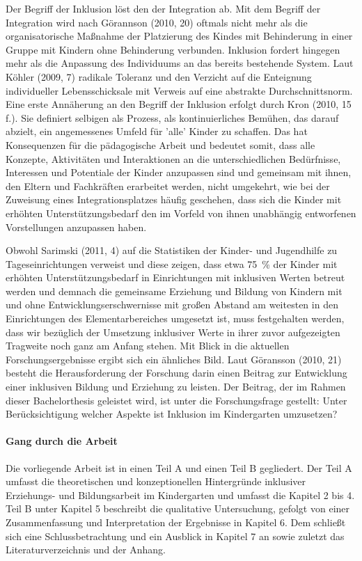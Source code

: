 Der Begriff der Inklusion löst den der Integration ab. Mit dem Begriff der Integration wird nach Görannson (2010, 20) oftmals nicht mehr als die organisatorische Maßnahme der Platzierung des Kindes mit Behinderung in einer Gruppe mit Kindern ohne Behinderung verbunden. Inklusion fordert hingegen mehr als die Anpassung des Individuums an das bereits bestehende System. Laut Köhler (2009, 7) radikale Toleranz und den Verzicht auf die Enteignung individueller Lebensschicksale mit Verweis auf eine abstrakte Durchschnittsnorm. Eine erste Annäherung an den Begriff der Inklusion erfolgt durch Kron (2010, 15 f.). Sie definiert selbigen als Prozess, als kontinuierliches Bemühen, das darauf abzielt, ein angemessenes Umfeld für ’alle’ Kinder zu schaffen. Das hat Konsequenzen für die pädagogische Arbeit und bedeutet somit, dass alle Konzepte, Aktivitäten und Interaktionen an die unterschiedlichen Bedürfnisse, Interessen und Potentiale der Kinder anzupassen sind und gemeinsam mit ihnen, den Eltern und Fachkräften erarbeitet werden, nicht umgekehrt, wie bei der Zuweisung eines Integrationsplatzes häufig geschehen, dass sich die Kinder mit erhöhten Unterstützungsbedarf den im Vorfeld von ihnen unabhängig entworfenen Vorstellungen anzupassen haben.  

Obwohl Sarimski (2011, 4) auf die Statistiken der Kinder- und Jugendhilfe zu Tageseinrichtungen verweist und diese zeigen, dass etwa 75~\% der Kinder mit erhöhten Unterstützungsbedarf in Einrichtungen mit inklusiven Werten betreut werden und demnach die gemeinsame Erziehung und Bildung von Kindern mit und ohne Entwicklungserschwernisse mit großen Abstand am weitesten in den Einrichtungen des Elementarbereiches umgesetzt ist, muss festgehalten werden, dass wir bezüglich der Umsetzung inklusiver Werte in ihrer zuvor aufgezeigten Tragweite noch ganz am Anfang stehen. Mit Blick in die aktuellen Forschungsergebnisse ergibt sich ein ähnliches Bild. Laut Göransson (2010, 21) besteht die Herausforderung der Forschung darin einen Beitrag zur Entwicklung einer inklusiven Bildung und Erziehung zu leisten. Der Beitrag, der im Rahmen dieser Bachelorthesis geleistet wird, ist unter die Forschungsfrage gestellt: Unter Berücksichtigung welcher Aspekte ist Inklusion im Kindergarten umzusetzen?

\paragraph{Gang durch die Arbeit} 
Die vorliegende Arbeit ist in einen Teil A und einen Teil B gegliedert. Der Teil A umfasst die theoretischen und konzeptionellen Hintergründe inklusiver Erziehungs- und Bildungsarbeit im Kindergarten und umfasst die Kapitel 2 bis 4. Teil B unter Kapitel 5 beschreibt die qualitative Untersuchung, gefolgt von einer Zusammenfassung und Interpretation der Ergebnisse in Kapitel 6. Dem schließt sich eine Schlussbetrachtung und ein Ausblick in Kapitel 7 an sowie zuletzt das Literaturverzeichnis und der Anhang.

